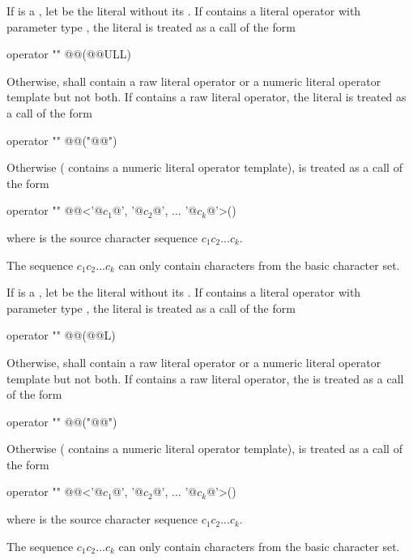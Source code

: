 \pnum
If  is a , let  be the literal
without its . If  contains a literal operator with
parameter type , the literal  is treated as a call of
the form
\begin{codeblock}
operator "" @@(@@ULL)
\end{codeblock}
Otherwise,  shall contain a raw literal operator
or a numeric literal operator template but not both.
If  contains a raw literal operator,
the literal  is treated as a call of the form
\begin{codeblock}
operator "" @@("@@")
\end{codeblock}
Otherwise ( contains a numeric literal operator template),
 is treated as a call of the form
\begin{codeblock}
operator "" @@<'@$c_1$@', '@$c_2$@', ... '@$c_k$@'>()
\end{codeblock}
where  is the source character sequence $c_1c_2...c_k$.
\begin{note}
The sequence
$c_1c_2...c_k$ can only contain characters from the basic character set.
\end{note}

\pnum
If  is a , let  be the
literal without its . If  contains a literal operator
with parameter type , the literal  is treated as a call of
the form
\begin{codeblock}
operator "" @@(@@L)
\end{codeblock}
Otherwise,  shall contain a raw literal operator
or a numeric literal operator template but not both.
If  contains a raw literal operator,
the   is treated as a call of the form
\begin{codeblock}
operator "" @@("@@")
\end{codeblock}
Otherwise ( contains a numeric literal operator template),
 is treated as a call of the form
\begin{codeblock}
operator "" @@<'@$c_1$@', '@$c_2$@', ... '@$c_k$@'>()
\end{codeblock}
where  is the source character sequence $c_1c_2...c_k$.
\begin{note}
The sequence
$c_1c_2...c_k$ can only contain characters from the basic character set.
\end{note}

